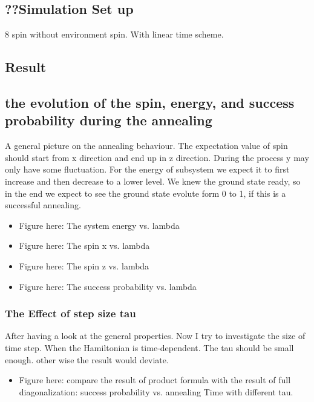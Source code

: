 \documentclass[twoside,a4paper,article]{combine}
\begin{document}
\subsection{??Simulation Set up}
	8 spin without environment spin. With linear time scheme. 

\subsection{Result}
\subsection{the evolution of the spin, energy, and success probability during the annealing}
	A general picture on the annealing behaviour. The expectation value of spin should start from x direction and end up in z direction. During the process y may only have some fluctuation. For the energy of subsystem we expect it to first increase and then decrease to a lower level. We knew the ground state ready, so in the end we expect to see the ground state evolute form 0 to 1, if this is a successful annealing.
	\begin{itemize}
		\item \checkmark Figure here: The system energy vs. lambda
		\item \checkmark Figure here: The spin x vs. lambda
		\item \checkmark Figure here: The spin z vs. lambda
		\item \checkmark Figure here: The success probability vs. lambda
	\end{itemize}
\subsubsection{The Effect of step size tau}
	After having a look at the general properties. Now I try to investigate the size of time step. When the Hamiltonian is time-dependent. The tau should be small enough.  other wise the result would deviate. 
	\begin{itemize}
		\item \checkmark Figure here: compare the result of product formula with the result of full diagonalization: success probability vs. annealing Time with different tau.
	\end{itemize}
\end{document}
